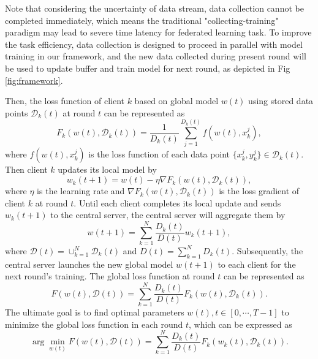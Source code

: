 \documentclass{article}
\theoremstyle{plain}
\theoremstyle{definition}
\theoremstyle{remark}
\begin{document}
Note that considering the uncertainty of data stream, data collection cannot be completed immediately, which means the traditional "collecting-training" paradigm may lead to severe time latency for federated learning task.
To improve the task efficiency, data collection is designed to proceed in parallel with model training in our framework, and the new data collected during present round will be used to update buffer and train model for next round, as depicted in Fig \ref{fig:framework}.

Then, the loss function of client $k$ based on global model $w(t)$ using stored data points $\mathcal{D}_k(t)$ at round $t$ can be represented as 
\begin{equation}
  F_k(w(t), \mathcal{D}_k(t)) = \frac{1}{D_k(t)} \sum_{j=1}^{D_k(t)} f(w(t), x_k^j),
\end{equation}
where $f(w(t), x_k^j)$ is the loss function of each data point $\{x_k^j, y_k^j\} \in \mathcal{D}_k(t)$.
Then client $k$ updates its local model by
\begin{equation}
  w_k(t+1) = w(t) - \eta \nabla F_k(w(t), \mathcal{D}_k(t)),
\end{equation}
where $\eta$ is the learning rate and $\nabla F_k(w(t), \mathcal{D}_k(t))$ is the loss gradient of client $k$ at round $t$. 
Until each client completes its local update and sends $w_k(t+1)$ to the central server, the central server will aggregate them by
\begin{equation}
  w(t+1) = \sum_{k=1}^{N} \frac{D_k(t)}{D(t)} w_k(t+1),
\end{equation}
where $\mathcal{D}(t) = \cup_{k=1}^N \mathcal{D}_k(t)$ and $D(t) = \sum_{k=1}^{N} D_k(t)$.
Subsequently, the central server launches the new global model $w(t+1)$ to each client for the next round's training.
The global loss function at round $t$ can be represented as
\begin{equation}
  F(w(t), \mathcal{D}(t)) = \sum_{k=1}^{N} \frac{D_k(t)}{D(t)} F_k(w(t), \mathcal{D}_k(t)).
\end{equation}
The ultimate goal is to find optimal parameters $w(t), t \in [0, \cdots, T-1]$ to minimize the global loss function in each round $t$, which can be expressed as
\begin{equation}
  \arg \min_{w(t)} F(w(t), \mathcal{D}(t)) = \sum_{k=1}^{N} \frac{D_k(t)}{D(t)} F_k(w_k(t), \mathcal{D}_k(t)).
\end{equation}
\end{document}
